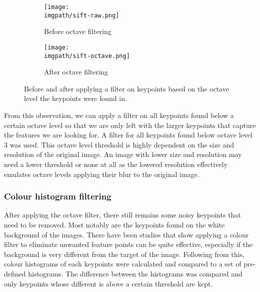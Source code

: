 \begin{figure}[H]
	\begin{subfigure}{0.5\textwidth}
	\texttt{[image: \\imgpath/sift-raw.png]}
	\caption{Before octave filtering}
	\end{subfigure}
	\hspace*{\fill}
	\begin{subfigure}{0.5\textwidth}
	\texttt{[image: \\imgpath/sift-octave.png]}
	\caption{After octave filtering}
	\end{subfigure}
\caption{Before and after applying a filter on keypoints based on the octave level the keypoints were found in.}
\end{figure}
\noindent
From this observation, we can apply a filter on all keypoints found below a certain octave level so that we are only left with the larger keypoints that capture the features we are looking for. A filter for all keypoints found below octave level 3 was used. This octave level threshold is highly dependent on the size and resolution of the original image. An image with lower size and resolution may need a lower threshold or none at all as the lowered resolution effectively emulates octave levels applying their blur to the original image. 


\subsubsection{Colour histogram filtering}
After applying the octave filter, there still remains some noisy keypoints that need to be removed. Most notably are the keypoints found on the white background of the images. There have been studies \cite{color-histogram} \cite{color-filter} that show applying a colour filter to eliminate unwanted feature points can be quite effective, especially if the background is very different from the target of the image. Following from this, colour histograms of each keypoints were calculated and compared to a set of pre-defined histograms. The difference between the histograms was compared and only keypoints whose different is above a certain threshold are kept. 

